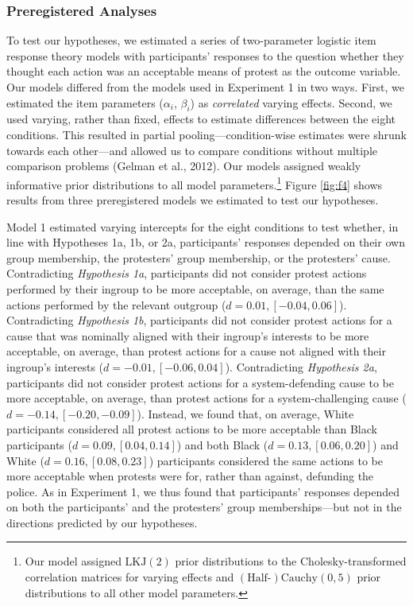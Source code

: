 \documentclass[12pt, letterpaper]{article}
\begin{document}
\hypertarget{preregistered-analyses-1}{%
\subsubsection{Preregistered Analyses}\label{preregistered-analyses-1}}

To test our hypotheses, we estimated a series of two-parameter logistic
item response theory models with participants' responses to the question
whether they thought each action was an acceptable means of protest as
the outcome variable. Our models differed from the models used in
Experiment 1 in two ways. First, we estimated the item parameters
(\(\alpha_i\), \(\beta_i\)) as \emph{correlated} varying effects.
Second, we used varying, rather than fixed, effects to estimate
differences between the eight conditions. This resulted in partial
pooling---condition-wise estimates were shrunk towards each other---and
allowed us to compare conditions without multiple comparison problems
(Gelman et al., 2012). Our models assigned weakly informative prior
distributions to all model parameters.\footnote{Our model assigned
  \(\text{LKJ} (2)\) prior distributions to the Cholesky-transformed
  correlation matrices for varying effects and
  \((\text{Half-})\text{Cauchy} (0, 5)\) prior distributions to all
  other model parameters.} Figure \ref{fig:f4} shows results from three
preregistered models we estimated to test our hypotheses.

Model 1 estimated varying intercepts for the eight conditions to test
whether, in line with Hypotheses 1a, 1b, or 2a, participants' responses
depended on their own group membership, the protesters' group
membership, or the protesters' cause. Contradicting \emph{Hypothesis
1a}, participants did not consider protest actions performed by their
ingroup to be more acceptable, on average, than the same actions
performed by the relevant outgroup (\(d = 0.01, [-0.04, 0.06]\)).
Contradicting \emph{Hypothesis 1b}, participants did not consider
protest actions for a cause that was nominally aligned with their
ingroup's interests to be more acceptable, on average, than protest
actions for a cause not aligned with their ingroup's interests
(\(d = -0.01, [-0.06, 0.04]\)). Contradicting \emph{Hypothesis 2a},
participants did not consider protest actions for a system-defending
cause to be more acceptable, on average, than protest actions for a
system-challenging cause (\(d = -0.14, [-0.20, -0.09]\)). Instead, we
found that, on average, White participants considered all protest
actions to be more acceptable than Black participants
(\(d = 0.09, [0.04, 0.14]\)) and both Black (\(d = 0.13, [0.06, 0.20]\))
and White (\(d = 0.16, [0.08, 0.23]\)) participants considered the same
actions to be more acceptable when protests were for, rather than
against, defunding the police. As in Experiment 1, we thus found that
participants' responses depended on both the participants' and the
protesters' group memberships---but not in the directions predicted by
our hypotheses.
\end{document}
